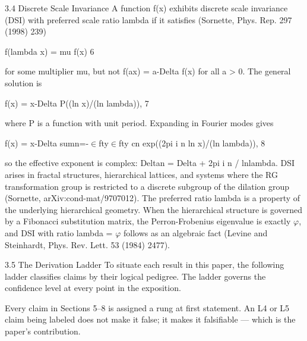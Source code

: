   3.4 Discrete Scale Invariance
  A function f(x) exhibits discrete scale invariance (DSI) with preferred scale ratio lambda
  if it satisfies (Sornette, Phys. Rep. 297 (1998) 239)

  f(lambda x) = mu f(x) 6

  for some multiplier mu, but not f(ax) = a-Delta f(x) for all a > 0. The general solution is

  f(x) = x-Delta P((ln x)/(ln lambda)), 7

  where P is a function with unit period. Expanding in Fourier modes gives

  f(x) = x-Delta sumn=-$\in$fty$\in$fty cn exp((2pi i n ln x)/(ln lambda)), 8

  so the effective exponent is complex: Deltan = Delta + 2pi i n / lnlambda. DSI arises in
  fractal structures, hierarchical lattices, and systems where the RG transformation
  group is restricted to a discrete subgroup of the dilation group (Sornette,
  arXiv:cond-mat/9707012). The preferred ratio lambda is a property of the underlying
  hierarchical geometry. When the hierarchical structure is governed by a Fibonacci
  substitution matrix, the Perron-Frobenius eigenvalue is exactly $\varphi$, and DSI with ratio
  lambda = $\varphi$ follows as an algebraic fact (Levine and Steinhardt, Phys. Rev. Lett. 53
  (1984) 2477).

  3.5 The Derivation Ladder
  To situate each result in this paper, the following ladder classifies claims by their
  logical pedigree. The ladder governs the confidence level at every point in the
  exposition.

  Every claim in Sections 5--8 is assigned a rung at first statement. An L4 or L5 claim
  being labeled does not make it false; it makes it falsifiable --- which is the paper's
  contribution.